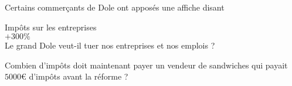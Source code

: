 
\begin{exercice}\label{exoPremiere-0054}

    Certains commerçants de Dole ont apposés une affiche disant 
    \begin{center}
        Impôts sur les entreprises\\
        \( +300\%\)\\
        Le grand Dole veut-il tuer nos entreprises et nos emplois ?
    \end{center}
    Combien d'impôts doit maintenant payer un vendeur de sandwiches qui payait \( 5000\)€ d'impôts avant la réforme ?

\end{exercice}

